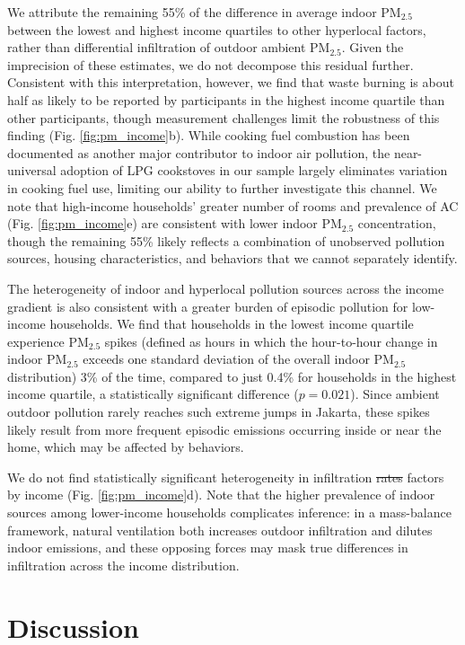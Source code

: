 \documentclass[9pt,twocolumn,twoside]{pnas-new}
\providecommand{\DIFadd}[1]{{\protect\color{red}#1}}
\providecommand{\DIFdel}[1]{{\protect\color{red}\protect\sout{#1}}}
\begin{document}
We attribute the remaining 55\% of the difference in average indoor PM$_{2.5}$ between the lowest and highest income quartiles to other hyperlocal factors, rather than differential infiltration of outdoor ambient PM$_{2.5}$. Given the imprecision of these estimates, we do not decompose this residual further. Consistent with this interpretation, however, we find that waste burning is about half as likely to be reported by participants in the highest income quartile than other participants, though measurement challenges limit the robustness of this finding (Fig. \ref{fig:pm_income}b). While cooking fuel combustion has been documented as another major contributor to indoor air pollution, the near-universal adoption of LPG cookstoves in our sample largely eliminates variation in cooking fuel use, limiting our ability to further investigate this channel. We note that high-income households’ greater number of rooms and prevalence of AC (Fig. \ref{fig:pm_income}e) are consistent with lower indoor PM$_{2.5}$ concentration, though the remaining 55\% likely reflects a combination of unobserved pollution sources, housing characteristics, and behaviors that we cannot separately identify.

The heterogeneity of indoor and hyperlocal pollution sources across the income gradient is also consistent with a greater burden of episodic pollution for low-income households. We find that households in the lowest income quartile experience PM$_{2.5}$ spikes (defined as hours in which the hour-to-hour change in indoor PM$_{2.5}$ exceeds one standard deviation of the overall indoor PM$_{2.5}$ distribution) 3\% of the time, compared to just 0.4\% for households in the highest income quartile, a statistically significant difference ($p = 0.021$). Since ambient outdoor pollution rarely reaches such extreme jumps in Jakarta, these spikes likely result from more frequent episodic emissions occurring inside or near the home, which may be affected by behaviors.

We do not find statistically significant heterogeneity in infiltration \DIFdel{rates} \DIFadd{factors} by income (Fig. \ref{fig:pm_income}d). Note that the higher prevalence of indoor sources among lower-income households complicates inference: in a mass-balance framework, natural ventilation both increases outdoor infiltration and dilutes indoor emissions, and these opposing forces may mask true differences in infiltration across the income distribution.

\section{Discussion}
\end{document}
